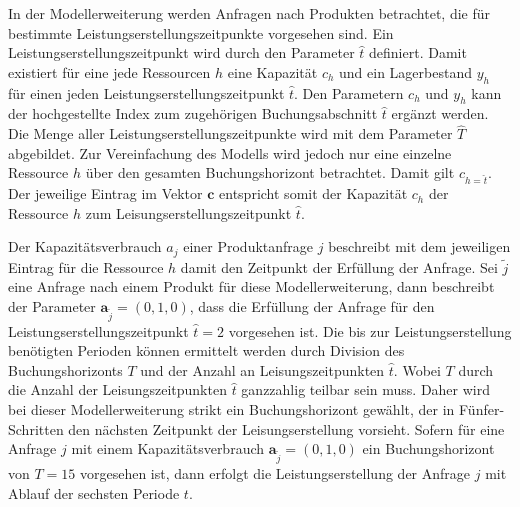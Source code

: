 In der Modellerweiterung werden Anfragen nach Produkten betrachtet, die für bestimmte Leistungserstellungszeitpunkte vorgesehen sind. Ein Leistungserstellungszeitpunkt wird durch den Parameter $\hat{t}$ definiert. Damit existiert für eine jede Ressourcen $h$ eine Kapazität $c_h$ und ein Lagerbestand $y_h$ für einen jeden Leistungserstellungszeitpunkt $\hat{t}$. Den Parametern $c_h$ und $y_h$ kann der hochgestellte Index zum zugehörigen Buchungsabschnitt $\hat{t}$ ergänzt werden. Die Menge aller Leistungserstellungszeitpunkte wird mit dem Parameter $\hat T$ abgebildet. Zur Vereinfachung des Modells wird jedoch nur eine einzelne Ressource $h$ über den gesamten Buchungshorizont betrachtet. Damit gilt $c_{h=\hat t}$. Der jeweilige Eintrag im Vektor $\textbf{c}$ entspricht somit der Kapazität $c_h$ der Ressource $h$ zum Leisungserstellungszeitpunkt $\hat{t}$.

Der Kapazitätsverbrauch $a_{j}$ einer Produktanfrage $j$ beschreibt mit dem jeweiligen Eintrag für die Ressource $h$ damit den Zeitpunkt der Erfüllung der Anfrage. Sei $\tilde{j}$ eine Anfrage nach einem Produkt für diese Modellerweiterung, dann beschreibt der Parameter $\textbf{a}_{\tilde{j}}=(0,1,0)$, dass die Erfüllung der Anfrage für den Leistungserstellungszeitpunkt $\hat{t}=2$ vorgesehen ist. Die bis zur Leistungserstellung benötigten Perioden können ermittelt werden durch Division des Buchungshorizonts $T$ und der Anzahl an Leisungszeitpunkten $\hat t$. Wobei $T$ durch die Anzahl der Leisungszeitpunkten $\hat t$ ganzzahlig teilbar sein muss. Daher wird bei dieser Modellerweiterung strikt ein Buchungshorizont gewählt, der in Fünfer-Schritten den nächsten Zeitpunkt der Leisungserstellung vorsieht. Sofern für eine Anfrage $j$ mit einem Kapazitätsverbrauch $\textbf{a}_{\tilde{j}}=(0,1,0)$ ein Buchungshorizont von $T=15$ vorgesehen ist, dann erfolgt die Leistungserstellung der Anfrage $j$ mit Ablauf der sechsten Periode $t$.

